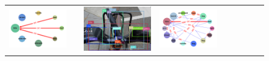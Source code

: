 \begin{figure}
\begin{tabular}{p{0.3cm}|rc|p{0.1cm}rc|p{0.1cm}rc}
		\includegraphics[width=\figwidthvis, align=c]{2412160_baseline_zs_graph_gt.png} & & \includegraphics[width=\figwidthvis, align=c]{2412160_baseline_zs_baseline.png} &
		\includegraphics[width=\figwidthvis, align=c]{2412160_baseline_zs_graph_baseline.png} & 

\end{tabular}
\end{figure}

